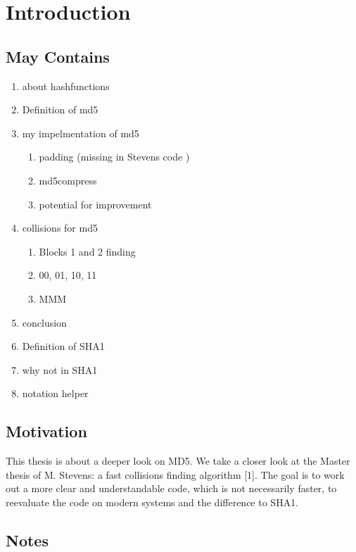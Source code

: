 \chapter{Introduction}
\section{May Contains}
\begin{enumerate}

    \item about hashfunctions
    \item Definition of md5
    \item my impelmentation of md5
        \begin{enumerate}
            \item padding (missing in Stevens code )
            \item md5compress
            \item potential for improvement 
        \end{enumerate}
    \item collisions for md5
        \begin{enumerate}
            \item Blocks 1 and 2 finding 
            \item 00, 01, 10, 11
            \item MMM
        \end{enumerate}
    \item conclusion
    \item Definition of SHA1
    \item why not in SHA1
    \item notation helper

\end{enumerate}
\section*{Motivation}
This thesis is about a deeper look on MD5.
We take a closer look at the Master thesis of M. Stevens: a fast collisions finding algorithm [1].
The goal is to work out a more clear and understandable code, which is not necessarily faster, to reevaluate the code on modern systems and the difference to SHA1. 


\section*{Notes}




